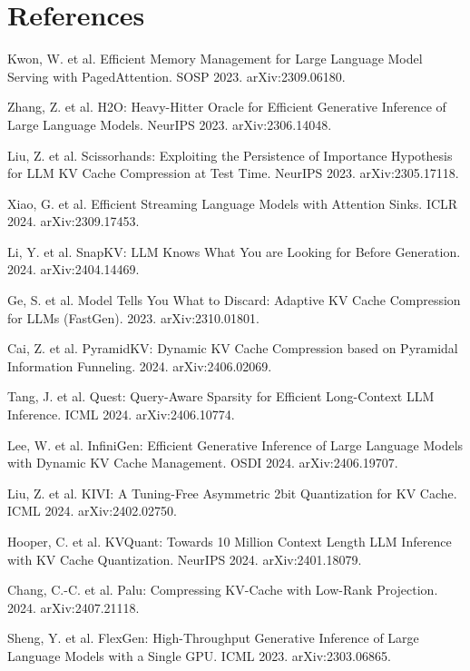 \documentclass[12pt,a4paper]{report}
\begin{document}
\chapter*{References}
\begin{list}{}{\setlength{\leftmargin}{2.2em}\setlength{\labelwidth}{2.2em}\setlength{\itemsep}{2pt}}
\item[{[1]}] Kwon, W. et al. Efficient Memory Management for Large Language Model Serving with PagedAttention. SOSP 2023. arXiv:2309.06180.
\item[{[2]}] Zhang, Z. et al. H2O: Heavy-Hitter Oracle for Efficient Generative Inference of Large Language Models. NeurIPS 2023. arXiv:2306.14048.
\item[{[3]}] Liu, Z. et al. Scissorhands: Exploiting the Persistence of Importance Hypothesis for LLM KV Cache Compression at Test Time. NeurIPS 2023. arXiv:2305.17118.
\item[{[4]}] Xiao, G. et al. Efficient Streaming Language Models with Attention Sinks. ICLR 2024. arXiv:2309.17453.
\item[{[5]}] Li, Y. et al. SnapKV: LLM Knows What You are Looking for Before Generation. 2024. arXiv:2404.14469.
\item[{[6]}] Ge, S. et al. Model Tells You What to Discard: Adaptive KV Cache Compression for LLMs (FastGen). 2023. arXiv:2310.01801.
\item[{[7]}] Cai, Z. et al. PyramidKV: Dynamic KV Cache Compression based on Pyramidal Information Funneling. 2024. arXiv:2406.02069.
\item[{[8]}] Tang, J. et al. Quest: Query-Aware Sparsity for Efficient Long-Context LLM Inference. ICML 2024. arXiv:2406.10774.
\item[{[9]}] Lee, W. et al. InfiniGen: Efficient Generative Inference of Large Language Models with Dynamic KV Cache Management. OSDI 2024. arXiv:2406.19707.
\item[{[10]}] Liu, Z. et al. KIVI: A Tuning-Free Asymmetric 2bit Quantization for KV Cache. ICML 2024. arXiv:2402.02750.
\item[{[11]}] Hooper, C. et al. KVQuant: Towards 10 Million Context Length LLM Inference with KV Cache Quantization. NeurIPS 2024. arXiv:2401.18079.
\item[{[12]}] Chang, C.-C. et al. Palu: Compressing KV-Cache with Low-Rank Projection. 2024. arXiv:2407.21118.
\item[{[13]}] Sheng, Y. et al. FlexGen: High-Throughput Generative Inference of Large Language Models with a Single GPU. ICML 2023. arXiv:2303.06865.

\end{list}
\end{document}
